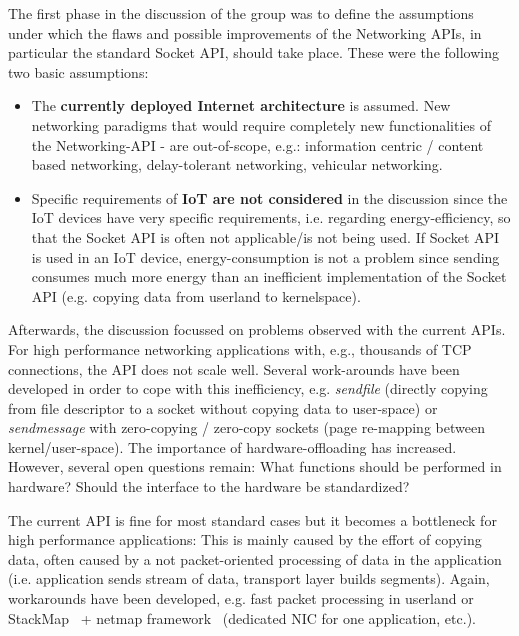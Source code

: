 The first phase in the discussion of the group was to define the assumptions
under which the flaws and possible improvements of the Networking APIs, in
particular the standard Socket API, should take place.  These were the
following two basic assumptions:

\begin{itemize}

\item The \textbf{currently deployed Internet architecture} is assumed.  New
networking paradigms that would require completely new functionalities of the
Networking-API - are out-of-scope, e.g.: information centric / content based
networking, delay-tolerant networking, vehicular networking.

\item Specific requirements of \textbf{IoT are not considered} in the
discussion since the IoT devices have very specific requirements, i.e.
regarding energy-efficiency, so that the Socket API is often not applicable/is
not being used. If Socket API is used in an IoT device, energy-consumption is
not a problem since sending consumes much more energy than an inefficient
implementation of the Socket API (e.g.  copying data from userland to
kernelspace).

\end{itemize}

Afterwards, the discussion focussed on problems observed with the current
APIs. For high performance networking applications with, e.g., thousands of
TCP connections, the API does not scale well. Several work-arounds have been
developed in order to cope with this inefficiency, e.g.  \emph{sendfile}
(directly copying from file descriptor to a socket without copying data to
user-space) or  \emph{sendmessage} with zero-copying / zero-copy sockets (page
re-mapping between kernel/user-space).  The importance of hardware-offloading
has increased. However, several open questions remain: What functions should
be performed in hardware?  Should the interface to the hardware be
standardized?

The current API is fine for most standard cases but it becomes a bottleneck
for high performance applications: This is mainly caused by the effort of
copying data, often caused by a not packet-oriented processing of data in the
application (i.e. application sends stream of data, transport layer builds
segments).  Again, workarounds have been developed, e.g. fast packet
processing in userland or StackMap~\cite{mhonda:usenix:2016} + netmap
framework~\cite{lrizzo:usenix:2012} (dedicated NIC for one application, etc.).

